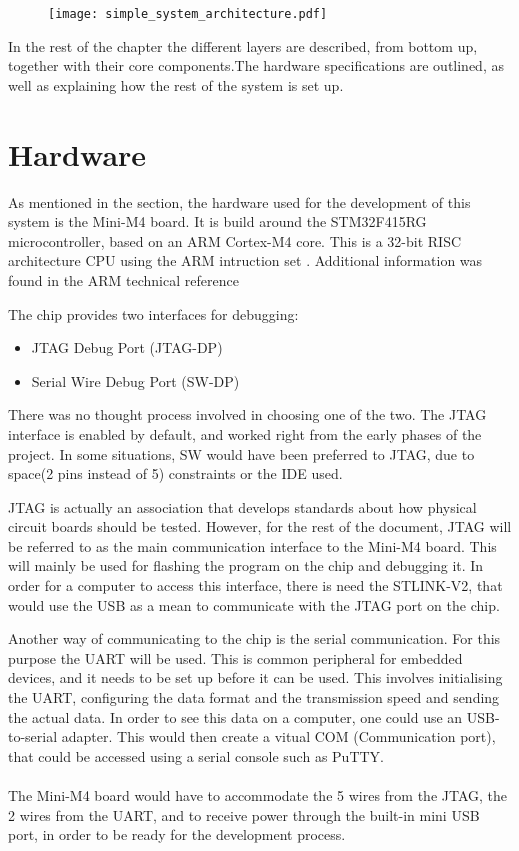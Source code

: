 \begin{figure}[H]
\centering
\texttt{[image: simple\_system\_architecture.pdf]}
\label{fig:simple_system}
\end{figure}

In the rest of the chapter the different layers are described,
from bottom up, 
together with their core components.The hardware specifications
are outlined, as well as explaining how the rest of the system is
set up.


\section{Hardware}

As mentioned in the  section,
the hardware used for the development of this system is the Mini-M4
board. It is build around the STM32F415RG microcontroller, based on
an ARM Cortex-M4 core. This is a 32-bit RISC architecture CPU using 
the ARM intruction set \cite{arm_architecture}. Additional information
was found in the ARM technical reference \cite{arm_technical} 

The chip provides two interfaces for debugging:
\begin{itemize}[noitemsep]
	\item JTAG Debug Port (JTAG-DP)
	\item Serial Wire Debug Port (SW-DP)
\end{itemize}
There was no thought process involved in choosing one of the two.
The JTAG interface is enabled by default, and worked right from the
early phases of the project. In some situations, SW would have been
preferred to JTAG, due to space(2 pins instead of 5) constraints
 or the IDE used.

JTAG is actually an association that develops standards about how 
physical circuit boards should be tested. However, for the rest of
the document, JTAG will be referred to as the main communication interface
to the Mini-M4 board. This will mainly be used for flashing the program
on the chip and debugging it. In order for a computer to access this
interface, there is need the STLINK-V2, that would 
use the USB as a mean to communicate with the JTAG port on the chip.

Another way of communicating to the chip is the serial communication.
For this purpose the UART will be used. This is common peripheral for 
embedded devices, and it needs to be set up before it can be used. This
involves initialising the UART, configuring the data format and the
transmission speed and sending the actual data. In order to see this data
on a computer, one could use an USB-to-serial adapter. This would then
create a vitual COM (Communication port), that could be accessed using
a serial console such as PuTTY.
\\\\
The Mini-M4 board would have to accommodate the 5 wires from the JTAG,
the 2 wires from the UART, and to receive power through the built-in
mini USB port, in order to be ready for the development process.

